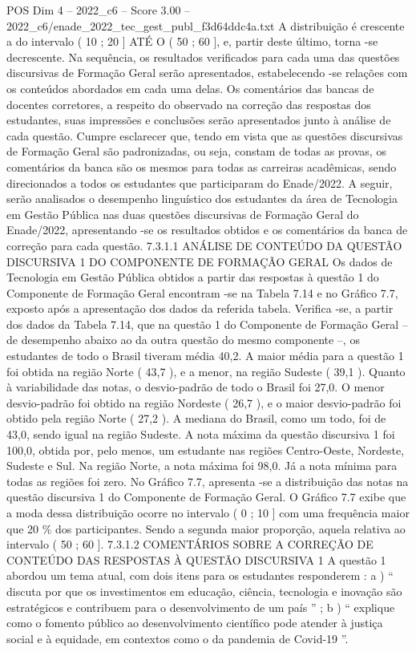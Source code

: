 \begin{textsample}{POS Dim 4 – 2022\_c6 – Score 3.00 – 2022\_c6/enade\_2022\_tec\_gest\_publ\_f3d64ddc4a.txt}
A distribuição é crescente a do intervalo ( 10 ; 20 ] ATÉ O ( 50 ; 60 ], e, partir deste último, torna -se decrescente.
Na sequência, os resultados verificados para cada uma das questões discursivas de Formação Geral serão apresentados, estabelecendo -se relações com os conteúdos abordados em cada uma delas.
Os comentários das bancas de docentes corretores, a respeito do observado na correção das respostas dos estudantes, suas impressões e conclusões serão apresentados junto à análise de cada questão.
Cumpre esclarecer que, tendo em vista que as questões discursivas de Formação Geral são padronizadas, ou seja, constam de todas as provas, os comentários da banca são os mesmos para todas as carreiras acadêmicas, sendo direcionados a todos os estudantes que participaram do Enade/2022.
A seguir, serão analisados o desempenho linguístico dos estudantes da área de Tecnologia em Gestão Pública nas duas questões discursivas de Formação Geral do Enade/2022, apresentando -se os resultados obtidos e os comentários da banca de correção para cada questão. 7.3.1.1 ANÁLISE DE CONTEÚDO DA QUESTÃO DISCURSIVA 1 DO COMPONENTE DE FORMAÇÃO GERAL Os dados de Tecnologia em Gestão Pública obtidos a partir das respostas à questão 1 do Componente de Formação Geral encontram -se na Tabela 7.14 e no Gráfico 7.7, exposto após a apresentação dos dados da referida tabela.
Verifica -se, a partir dos dados da Tabela 7.14, que na questão 1 do Componente de Formação Geral – de desempenho abaixo ao da outra questão do mesmo componente –, os estudantes de todo o Brasil tiveram média 40,2.
A maior média para a questão 1 foi obtida na região Norte ( 43,7 ), e a menor, na região Sudeste ( 39,1 ).
Quanto à variabilidade das notas, o desvio-padrão de todo o Brasil foi 27,0.
O menor desvio-padrão foi obtido na região Nordeste ( 26,7 ), e o maior desvio-padrão foi obtido pela região Norte ( 27,2 ).
A mediana do Brasil, como um todo, foi de 43,0, sendo igual na região Sudeste.
A nota máxima da questão discursiva 1 foi 100,0, obtida por, pelo menos, um estudante nas regiões Centro-Oeste, Nordeste, Sudeste e Sul.
Na região Norte, a nota máxima foi 98,0.
Já a nota mínima para todas as regiões foi zero.
No Gráfico 7.7, apresenta -se a distribuição das notas na questão discursiva 1 do Componente de Formação Geral.
O Gráfico 7.7 exibe que a moda dessa distribuição ocorre no intervalo ( 0 ; 10 ] com uma frequência maior que 20 \% dos participantes.
Sendo a segunda maior proporção, aquela relativa ao intervalo ( 50 ; 60 ]. 7.3.1.2 COMENTÁRIOS SOBRE A CORREÇÃO DE CONTEÚDO DAS RESPOSTAS À QUESTÃO DISCURSIVA 1 A questão 1 abordou um tema atual, com dois itens para os estudantes responderem : a ) “ discuta por que os investimentos em educação, ciência, tecnologia e inovação são estratégicos e contribuem para o desenvolvimento de um país ” ; b ) “ explique como o fomento público ao desenvolvimento científico pode atender à justiça social e à equidade, em contextos como o da pandemia de Covid-19 ”.

\end{textsample}
